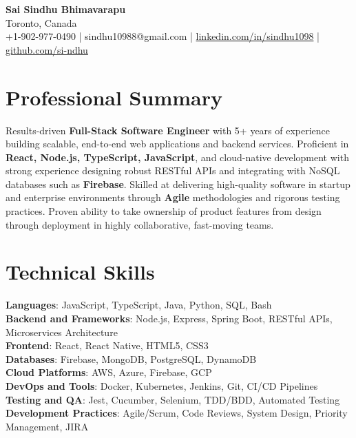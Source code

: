\documentclass[letterpaper,11pt]{article}
\begin{document}
\begin{center}
  {\Large \textbf{Sai Sindhu Bhimavarapu}} \\
  Toronto, Canada \\
  +1-902-977-0490 \enspace | \enspace sindhu10988@gmail.com \enspace | \enspace \href{https://www.linkedin.com/in/sindhu1098/}{linkedin.com/in/sindhu1098} \enspace | \enspace \href{https://github.com/si-ndhu}{github.com/si-ndhu}
\end{center}

\section{Professional Summary}
  \begin{itemize}[leftmargin=0.15in, label={}]
    \small{\item{
     Results-driven \textbf{Full-Stack Software Engineer} with 5+ years of experience building scalable, end-to-end web applications and backend services. Proficient in \textbf{React, Node.js, TypeScript, JavaScript}, and cloud-native development with strong experience designing robust RESTful APIs and integrating with NoSQL databases such as \textbf{Firebase}. Skilled at delivering high-quality software in startup and enterprise environments through \textbf{Agile} methodologies and rigorous testing practices. Proven ability to take ownership of product features from design through deployment in highly collaborative, fast-moving teams.
    }}
  \end{itemize}
\vspace{-16pt}

\section{Technical Skills}
 \begin{itemize}[leftmargin=0.15in, label={}]
    \small{\item{
     \textbf{Languages}: JavaScript, TypeScript, Java, Python, SQL, Bash \\
     \textbf{Backend and Frameworks}: Node.js, Express, Spring Boot, RESTful APIs, Microservices Architecture \\
     \textbf{Frontend}: React, React Native, HTML5, CSS3 \\
     \textbf{Databases}: Firebase, MongoDB, PostgreSQL, DynamoDB \\
     \textbf{Cloud Platforms}: AWS, Azure, Firebase, GCP \\
     \textbf{DevOps and Tools}: Docker, Kubernetes, Jenkins, Git, CI/CD Pipelines \\
     \textbf{Testing and QA}: Jest, Cucumber, Selenium, TDD/BDD, Automated Testing \\
     \textbf{Development Practices}: Agile/Scrum, Code Reviews, System Design, Priority Management, JIRA
    }}
 \end{itemize}
\vspace{-16pt}
\end{document}
